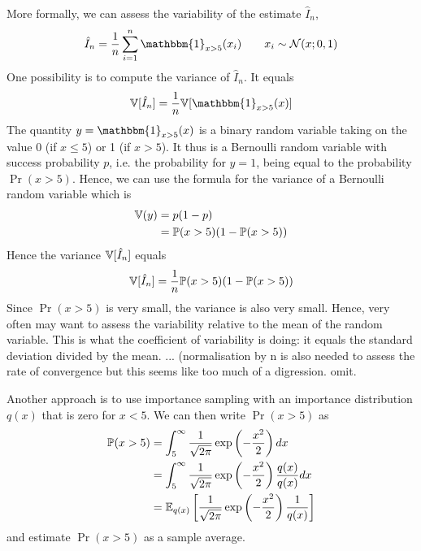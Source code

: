 \begin{exenumerate}
\begin{solution}
    More formally, we can assess the variability of the estimate $\hat{I}_n$,
    \begin{equation}
      \hat{I}_n = \frac{1}{n} \sum_{i=1}^n \mathbbm{1}_{x>5}(x_i) \quad \quad x_i \sim  \mathcal{N}(x; 0, 1)
    \end{equation}
    One possibility is to compute the variance of $\hat{I}_n$. It equals
    \begin{align}
      \Var[ \hat{I}_n] = \frac{1}{n} \Var[\mathbbm{1}_{x>5}(x)]
    \end{align}
    The quantity $y = \mathbbm{1}_{x>5}(x)$ is a binary random
    variable taking on the value 0 (if $x\le 5$) or 1 (if $x >5$). It
    thus is a Bernoulli random variable with success probability $p$,
    i.e. the probability for $y=1$, being equal to the probability
    $\Pr(x>5)$. Hence, we can use the formula for the variance of a Bernoulli random variable which is
    \begin{align}
      \mathbb{V}(y) &= p(1-p)\\
      & = \mathbb{P}(x>5)(1-\mathbb{P}(x>5))
    \end{align}
    Hence the variance $\mathbb{V}[ \hat{I}_n]$ equals
    \begin{equation}
      \mathbb{V}[ \hat{I}_n] = \frac{1}{n} \mathbb{P}(x>5)(1-\mathbb{P}(x>5))
    \end{equation}
    Since $\Pr(x>5)$ is very small, the variance is also very
    small. Hence, very often may want to assess the variability
    relative to the mean of the random variable. This is what the
    coefficient of variability is doing: it equals the standard
    deviation divided by the mean.  ...  (normalisation by n is also
    needed to assess the rate of convergence but this seems like too
    much of a digression. omit.
    \fi
  \end{solution}

\item Another approach is to use importance sampling with an importance distribution $q(x)$ that is zero for $x<5$. We can then write $\Pr(x>5)$ as
  \begin{align}
    \mathbb{P}(x>5) & = \int_{5}^\infty \frac{1}{\sqrt{2\pi}} \exp\left(-\frac{x^2}{2}\right) dx\\
    & = \int_{5}^\infty \frac{1}{\sqrt{2\pi}} \exp\left(-\frac{x^2}{2}\right) \frac{q(x)}{q(x)} dx \\
    & = \mathbb{E}_{q(x)} \left[\frac{1}{\sqrt{2\pi}} \exp\left(-\frac{x^2}{2}\right) \frac{1}{q(x)}\right]
  \end{align}
  and estimate $\Pr(x>5)$ as a sample average.
  

\end{exenumerate}
